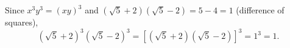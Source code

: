 Since $x^3y^3=(xy)^3$ and $\left(\sqrt5+2\right)\left(\sqrt5-2\right)=5-4=1$ (difference of squares),
\[
\left(\sqrt5+2\right)^3\left(\sqrt5-2\right)^3=\left[\left(\sqrt5+2\right)\left(\sqrt5-2\right)\right]^3=1^3=\boxed{1}.
\]
